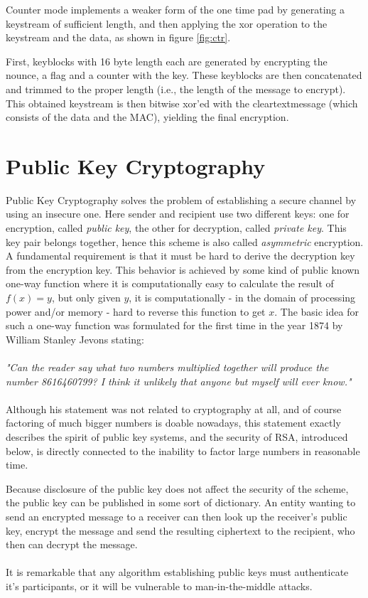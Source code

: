 Counter mode implements a weaker form of the one time pad by generating a keystream of sufficient
length, and then applying the \gls{xor} operation to the keystream and the data, as shown in figure \ref{fig:ctr}.


First, keyblocks with 16 byte length each are generated by encrypting the nounce, a flag and a counter with the key. These 
keyblocks are then concatenated and trimmed to the proper length (i.e., the length of the message to encrypt). This obtained keystream
is then bitwise \gls{xor}'ed with the cleartextmessage (which consists of the data and the MAC), yielding the final encryption.


\section{Public Key Cryptography}\label{pkc}

Public Key Cryptography solves the problem of establishing a secure channel by using an insecure one.
Here sender and recipient use two different keys: one for encryption, called \textit{public key}, the other
for decryption, called \textit{private key}. This key pair belongs together, hence this scheme is also called \textit{asymmetric} encryption. A fundamental requirement
is that it must be hard
to derive the decryption key from the encryption key. This behavior is achieved by some kind of public known one-way function where it is computationally
easy to calculate the result of $f(x) = y$, but only given $y$, it is computationally - in the domain of processing power and/or memory - hard
to reverse this function to get $x$.
The basic idea for such a one-way function was formulated for the first time in the year 1874 by William Stanley Jevons stating:
\\
\\
\textit{"Can the reader say what two numbers multiplied together will produce the number 8616460799? I think it unlikely that anyone but myself will
ever know."} \cite{wStanley} 
\\
\\
Although his statement was not related to cryptography at all, and of course factoring of much bigger numbers is doable nowadays, this statement exactly describes
the spirit of public key systems, and the security of RSA, introduced below, is directly connected to the inability to factor large numbers in reasonable time.

Because disclosure of the public key does not affect the security of the scheme, the public key can be published in some sort of dictionary.
An entity wanting to send an encrypted message to a receiver can then look up the receiver's public key, encrypt the message and send the resulting
ciphertext to the recipient, who then can decrypt the message. 
\\
\\
It is remarkable that any algorithm establishing public keys must authenticate it's participants, or it will be vulnerable to man-in-the-middle attacks.

